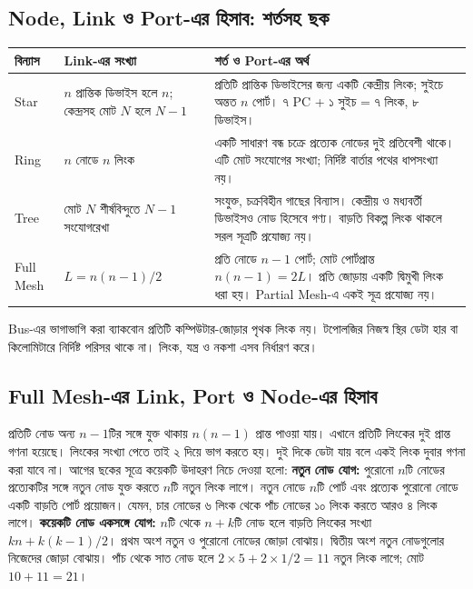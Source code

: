 \subsection{Node, Link ও Port-এর হিসাব: শর্তসহ ছক}
\begin{tabularx}{\linewidth}{|p{.17\linewidth}|p{.30\linewidth}|X|}\hline
\textbf{বিন্যাস} & \textbf{Link-এর সংখ্যা} & \textbf{শর্ত ও Port-এর অর্থ}\\\hline
Star & $n$ প্রান্তিক ডিভাইস হলে $n$; কেন্দ্রসহ মোট $N$ হলে $N-1$ & প্রতিটি প্রান্তিক ডিভাইসের জন্য একটি কেন্দ্রীয় লিংক; সুইচে অন্তত $n$ পোর্ট। ৭ PC + ১ সুইচ = ৭ লিংক, ৮ ডিভাইস।\\\hline
Ring & $n$ নোডে $n$ লিংক & একটি সাধারণ বন্ধ চক্রে প্রত্যেক নোডের দুই প্রতিবেশী থাকে। এটি মোট সংযোগের সংখ্যা; নির্দিষ্ট বার্তার পথের ধাপসংখ্যা নয়।\\\hline
Tree & মোট $N$ শীর্ষবিন্দুতে $N-1$ সংযোগরেখা & সংযুক্ত, চক্রবিহীন গাছের বিন্যাস। কেন্দ্রীয় ও মধ্যবর্তী ডিভাইসও নোড হিসেবে গণ্য। বাড়তি বিকল্প লিংক থাকলে সরল সূত্রটি প্রযোজ্য নয়।\\\hline
Full Mesh & $L=n(n-1)/2$ & প্রতি নোডে $n-1$ পোর্ট; মোট পোর্টপ্রান্ত $n(n-1)=2L$। প্রতি জোড়ায় একটি দ্বিমুখী লিংক ধরা হয়। Partial Mesh-এ একই সূত্র প্রযোজ্য নয়।\\\hline
\end{tabularx}
Bus-এর ভাগাভাগি করা ব্যাকবোন প্রতিটি কম্পিউটার-জোড়ার পৃথক লিংক নয়। টপোলজির নিজস্ব স্থির ডেটা হার বা কিলোমিটারে নির্দিষ্ট পরিসর থাকে না। লিংক, যন্ত্র ও নকশা এসব নির্ধারণ করে।

\subsection{Full Mesh-এর Link, Port ও Node-এর হিসাব}
\label{ch2:c09-08}
প্রতিটি নোড অন্য $n-1$টির সঙ্গে যুক্ত থাকায় $n(n-1)$ প্রান্ত পাওয়া যায়। এখানে প্রতিটি লিংকের দুই প্রান্ত গণনা হয়েছে। লিংকের সংখ্যা পেতে তাই ২ দিয়ে ভাগ করতে হয়। দুই দিকে ডেটা যায় বলে একই লিংক দুবার গণনা করা যাবে না। আগের ছকের সূত্রে কয়েকটি উদাহরণ নিচে দেওয়া হলো:
\textbf{নতুন নোড যোগ:} পুরোনো $n$টি নোডের প্রত্যেকটির সঙ্গে নতুন নোড যুক্ত করতে $n$টি নতুন লিংক লাগে। নতুন নোডে $n$টি পোর্ট এবং প্রত্যেক পুরোনো নোডে একটি বাড়তি পোর্ট প্রয়োজন। যেমন, চার নোডের ৬ লিংক থেকে পাঁচ নোডের ১০ লিংক করতে আরও ৪ লিংক লাগে।
\textbf{কয়েকটি নোড একসঙ্গে যোগ:} $n$টি থেকে $n+k$টি নোড হলে বাড়তি লিংকের সংখ্যা
$k n+k(k-1)/2$। প্রথম অংশ নতুন ও পুরোনো নোডের জোড়া বোঝায়। দ্বিতীয় অংশ নতুন নোডগুলোর নিজেদের জোড়া বোঝায়। পাঁচ থেকে সাত নোড হলে $2\times5+2\times1/2=11$ নতুন লিংক লাগে; মোট $10+11=21$।

